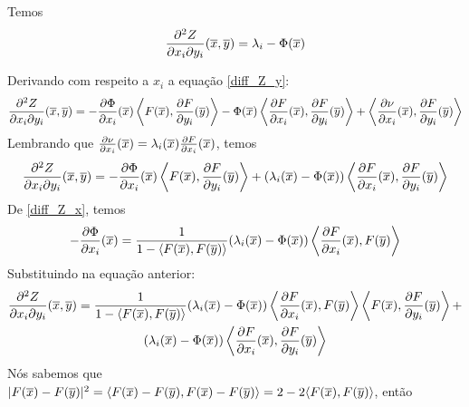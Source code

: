 \begin{proposicao}
	Temos
	\begin{equation}\label{diff_Z_x_y}
		\frac{\partial^2 Z}{\partial x_i \partial y_i}(\overline{x},\overline{y}) = \lambda_i - \Phi(\overline{x})
	\end{equation}
\end{proposicao}

\begin{demonstracao}
	Derivando com respeito a $x_i$ a equação \eqref{diff_Z_y}:
	\begin{equation*}
		\frac{\partial^2 Z}{\partial x_i \partial y_i}(\overline{x},\overline{y}) = -\frac{\partial \Phi}{\partial x_i}(\overline{x}) \left\langle F(\overline{x}), \frac{\partial F}{\partial y_i}(\overline{y}) \right\rangle - \Phi(\overline{x}) \left\langle \frac{\partial F}{\partial x_i}(\overline{x}), \frac{\partial F}{\partial y_i}(\overline{y}) \right\rangle + \left\langle \frac{\partial \nu}{\partial x_i}(\overline{x}), \frac{\partial F}{\partial y_i}(\overline{y}) \right\rangle
	\end{equation*}	
	Lembrando que $\frac{\partial \nu}{\partial x_i}(\overline{x}) = \lambda_i(\overline{x}) \frac{\partial F}{\partial x_i}(\overline{x})$, temos
	\begin{equation*}
		\frac{\partial^2 Z}{\partial x_i \partial y_i}(\overline{x},\overline{y}) = -\frac{\partial \Phi}{\partial x_i}(\overline{x}) \left\langle F(\overline{x}), \frac{\partial F}{\partial y_i}(\overline{y}) \right\rangle + (\lambda_i(\overline{x}) - \Phi(\overline{x})) \left\langle \frac{\partial F}{\partial x_i}(\overline{x}), \frac{\partial F}{\partial y_i}(\overline{y}) \right\rangle
	\end{equation*}	
	De \eqref{diff_Z_x}, temos
	\begin{equation*}
		-\frac{\partial \Phi}{\partial x_i}(\overline{x}) = \frac{1}{1 - \langle F(\overline{x}),F(\overline{y}) \rangle} (\lambda_i(\overline{x}) - \Phi(\overline{x})) \left\langle \frac{\partial F}{\partial x_i}(\overline{x}), F(\overline{y}) \right\rangle
	\end{equation*}	
	Substituindo na equação anterior:
	\begin{multline*}
		\frac{\partial^2 Z}{\partial x_i \partial y_i}(\overline{x},\overline{y}) =  \frac{1}{1 - \langle F(\overline{x}),F(\overline{y}) \rangle} (\lambda_i(\overline{x}) - \Phi(\overline{x})) \left\langle \frac{\partial F}{\partial x_i}(\overline{x}), F(\overline{y}) \right\rangle  \left\langle F(\overline{x}), \frac{\partial F}{\partial y_i}(\overline{y}) \right\rangle +\\
		(\lambda_i(\overline{x}) - \Phi(\overline{x})) \left\langle \frac{\partial F}{\partial x_i}(\overline{x}), \frac{\partial F}{\partial y_i}(\overline{y}) \right\rangle
	\end{multline*}	
	Nós sabemos que $|F(\overline{x}) - F(\overline{y})|^2 = \langle F(\overline{x}) - F(\overline{y}), F(\overline{x}) - F(\overline{y}) \rangle = 2 - 2 \langle F(\overline{x}), F(\overline{y}) \rangle$, então

\end{demonstracao}
